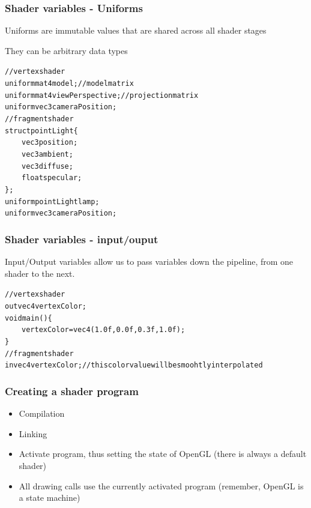 \documentclass{beamer}
\begin{document}
%
%
%
\begin{frame}
\frametitle{Shader variables - Uniforms}
Uniforms are immutable values that are shared across all shader stages

They can be arbitrary data types

\begin{alltt}\footnotesize
// vertex shader\\
uniform mat4 model; // model matrix\\
uniform mat4 viewPerspective; // projection matrix\\
uniform vec3 cameraPosition;\\

\vspace{3mm}
// fragment shader\\
struct pointLight \{\\
\ensuremath{\qquad}vec3 position;\\
\ensuremath{\qquad}vec3 ambient;\\
\ensuremath{\qquad}vec3 diffuse;\\
\ensuremath{\qquad}float specular;\\
\};\\
uniform pointLight lamp;\\
uniform vec3 cameraPosition;
\end{alltt}
\end{frame}


%
%
%
\begin{frame}
\frametitle{Shader variables - input/ouput}
Input/Output variables allow us to pass variables down the pipeline,
from one shader to the next.
\begin{alltt}\footnotesize
// vertex shader\\
out vec4 vertexColor;\\

void main() \{\\
\ensuremath{\qquad}vertexColor = vec4(1.0f, 0.0f, 0.3f, 1.0f);\\
\}\\

\vspace{3mm}
// fragment shader\\
in vec4 vertexColor; // this color value will be smoohtly interpolated\\
\end{alltt}
\end{frame}


%
%
%
\begin{frame}
\frametitle{Creating a shader program}

\begin{itemize}
\item Compilation

\item Linking

\item Activate program, thus setting the state of OpenGL
(there is always a default shader)

\item All drawing calls use the currently activated program
(remember, OpenGL is a state machine)
\end{itemize}
\end{frame}
\end{document}
